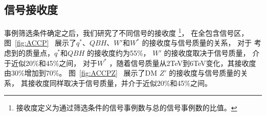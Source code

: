 \subsection{信号接收度}
\label{sec:DijetSelection3}

事例筛选条件确定之后，我们研究了不同信号的接收度
\footnote{接收度定义为通过筛选条件的信号事例数与总的信号事例数的比值。}，
在全包含信号区，
图~\ref{fig:ACCP}~
展示了$q^*$、$QBH$、$W'$和$W^*$
的接收度与信号质量的关系，
对于
考虑到的质量点，$q^*$和$QBH$
的接收度约为55\%，
$W'$
的接收度取决于信号质量，
介于近似20\%和45\%之间，
对于$W^*$
，随着信号质量从2TeV到6TeV变化，其接收度由30\%增加到70\%。
图~\ref{fig:ACCPZ}~
展示了DM $Z'$
的接收度与信号质量的关系，
其接收度同样取决于信号质量，并介于近似20\%和45\%之间。

